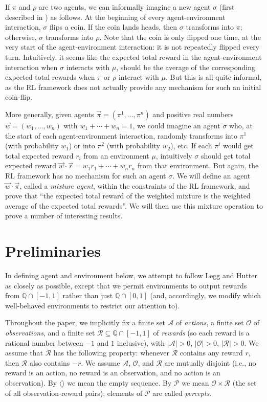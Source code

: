 \documentclass{article}
\begin{document}
If $\pi$ and $\rho$ are two agents, we can informally imagine a new agent
$\sigma$ (first described in \cite{alexander2021reward})
as follows. At the beginning of every agent-environment interaction,
$\sigma$ flips a coin. If the coin lands heads, then $\sigma$ transforms into
$\pi$; otherwise, $\sigma$ transforms into $\rho$. Note that the coin is only
flipped one time, at the very start of the agent-environment interaction:
it is not repeatedly flipped every turn. Intuitively, it seems like the
expected total reward in the agent-environment interaction
when $\sigma$ interacts with $\mu$, should be the average
of the corresponding expected total rewards when $\pi$ or $\rho$ interact
with $\mu$. But this is all quite informal, as the RL
framework does not actually provide any mechanism for such an initial
coin-flip.

More generally, given agents $\vec{\pi}=(\pi^1,\ldots,\pi^n)$ and positive real
numbers
$\vec{w}=(w_1,\ldots,w_n)$ with $w_1+\cdots+w_n=1$, we could imagine an agent $\sigma$
who, at the start of each agent-environment interaction, randomly transforms
into $\pi^1$ (with probability $w_1$) or into $\pi^2$ (with probability $w_2$),
etc. If each $\pi^i$ would get total expected reward $r_i$ from an environment
$\mu$, intuitively $\sigma$ should get total expected reward
$\vec{w}\cdot \vec{r}=w_1r_1+\cdots+w_nr_n$ from that environment.
But again, the RL
framework has no mechanism for such an agent $\sigma$. We will define
an agent $\vec{w}\cdot\vec{\pi}$, called a \emph{mixture agent},
within the constraints
of the RL framework, and prove that ``the expected total reward of the
weighted mixture is the weighted average of the expected total rewards''.
We will then use this mixture operation to prove a number of interesting results.

\section{Preliminaries}

In defining agent and environment below, we attempt to follow
Legg and Hutter \cite{legg2007universal} as closely as possible,
except that we permit environments to output rewards from $\mathbb Q \cap [-1,1]$
rather than just $\mathbb Q\cap [0,1]$ (and, accordingly, we modify which well-behaved
environments to restrict our attention to).

Throughout the paper, we implicitly
fix a finite set $\mathcal A$ of \emph{actions},
a finite set $\mathcal O$ of \emph{observations},
and a finite set $\mathcal R\subseteq \mathbb Q\cap [-1,1]$ of \emph{rewards}
(so each reward is a rational number between $-1$ and $1$ inclusive),
with $|\mathcal A|>0$,
$|\mathcal O|>0$, $|\mathcal R|>0$.
We assume that $\mathcal R$ has the following property:
whenever $\mathcal R$ contains any reward $r$, then $\mathcal R$
also contains $-r$.
We assume $\mathcal A$, $\mathcal O$, and $\mathcal R$ are mutually disjoint
(i.e., no reward is an action, no reward is an observation, and no action is an
observation).
By $\langle\rangle$ we mean the empty sequence.
By $\mathcal P$ we mean $\mathcal O\times\mathcal R$ (the set of all observation-reward
pairs); elements of $\mathcal P$ are called \emph{percepts}.
\end{document}
